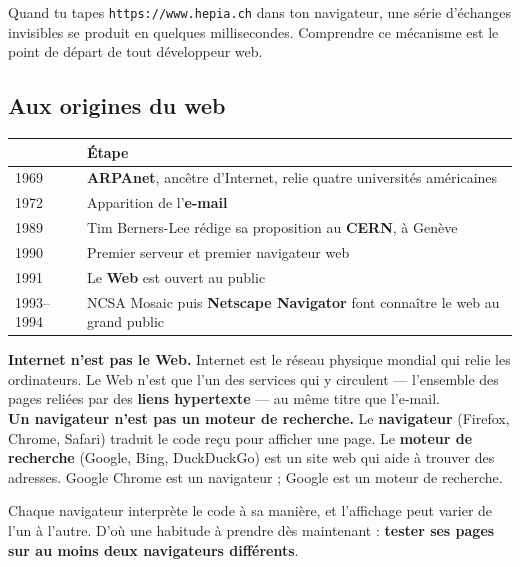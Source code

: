 \documentclass[a4paper,11pt]{article}
\newcommand{\hdr}[1]{\multicolumn{1}{l}{\color{white}\bfseries #1}}
\renewcommand{\arraystretch}{1.3}
\begin{document}
Quand tu tapes \texttt{https://www.hepia.ch} dans ton navigateur, une série d'échanges invisibles se produit en quelques millisecondes. Comprendre ce mécanisme est le point de départ de tout développeur web.

\subsection{Aux origines du web}

\begin{center}
\renewcommand{\arraystretch}{1.0}
\begin{tabularx}{\linewidth}{p{1.6cm}X}
  \toprule
  \rowcolor{uniNavy}
  \hdr{Année} &  \hdr{Étape} \\
  \midrule
  \rowcolor{uniPaper}
  1969 & \textbf{ARPAnet}, ancêtre d'Internet, relie quatre universités américaines \\
  1972 & Apparition de l'\textbf{e-mail} \\
  \rowcolor{uniPaper}
  1989 & Tim Berners-Lee rédige sa proposition au \textbf{CERN}, à Genève \\
  1990 & Premier serveur et premier navigateur web \\
  \rowcolor{uniPaper}
  1991 & Le \textbf{Web} est ouvert au public \\
  1993--1994 & NCSA Mosaic puis \textbf{Netscape Navigator} font connaître le web au grand public \\
  \bottomrule
\end{tabularx}
\end{center}

\begin{tcolorbox}[attention, title={Deux confusions courantes}]
\textbf{Internet n'est pas le Web.} Internet est le réseau physique mondial qui relie les ordinateurs. Le Web n'est que l'un des services qui y circulent --- l'ensemble des pages reliées par des \textbf{liens hypertexte} --- au même titre que l'e-mail.\\[4pt]
\textbf{Un navigateur n'est pas un moteur de recherche.} Le \textbf{navigateur} (Firefox, Chrome, Safari) traduit le code reçu pour afficher une page. Le \textbf{moteur de recherche} (Google, Bing, DuckDuckGo) est un site web qui aide à trouver des adresses. Google Chrome est un navigateur ; Google est un moteur de recherche.
\end{tcolorbox}

\begin{tcolorbox}[astuce, title={Une conséquence très concrète}]
Chaque navigateur interprète le code à sa manière, et l'affichage peut varier de l'un à l'autre. D'où une habitude à prendre dès maintenant : \textbf{tester ses pages sur au moins deux navigateurs différents}.
\end{tcolorbox}
\end{document}
